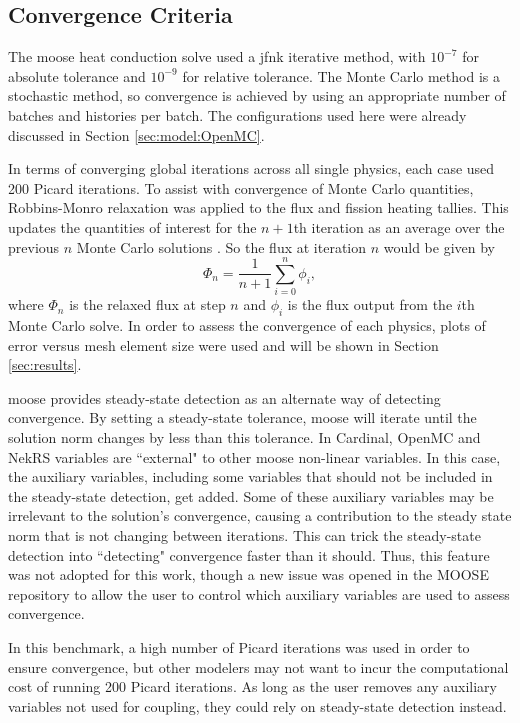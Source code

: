 \documentclass[letterpaper]{mc2023}
\begin{document}
\subsection{Convergence Criteria}
The \gls{moose} heat conduction solve used a \gls{jfnk} iterative method, with $10^{-7}$ for absolute tolerance and $10^{-9}$ for
relative tolerance. The Monte Carlo method is a stochastic method, so convergence is achieved by using an appropriate number of
batches and histories per batch. The configurations used here were already discussed in Section \ref{sec:model:OpenMC}.

In terms of converging global iterations across all single physics, each case used 200 Picard iterations. To assist with
convergence of Monte Carlo quantities, Robbins-Monro relaxation was applied to the flux and fission heating tallies. This updates the
quantities of interest for the $n+1$th iteration as an average over the previous $n$ Monte Carlo solutions \cite{dufek}.
So the flux at iteration $n$ would be given by
\begin{equation}\label{eq:Robbins-Monro}
    \Phi_{n} = \frac{1}{n+1} \sum_{i=0}^{n} \phi_{i},
\end{equation}
where $\Phi_{n}$ is the relaxed flux at step $n$ and $\phi_{i}$ is the flux output from the $i$th Monte Carlo solve. In order to
assess the convergence of each physics, plots of error versus mesh element size were used and will be shown in Section \ref{sec:results}.

\gls{moose} provides steady-state detection as an alternate way of detecting convergence. By setting a steady-state tolerance, \gls{moose}
will iterate until the solution norm changes by less than this tolerance. In Cardinal, OpenMC and NekRS variables are ``external" to other
\gls{moose} non-linear variables. In this case, the auxiliary variables, including some variables that should not be included in the
steady-state detection, get added. Some of these auxiliary variables may be irrelevant to the solution's convergence, causing a contribution
to the steady state norm that is not changing between iterations. This can trick the steady-state detection into ``detecting" convergence
faster than it should. Thus, this feature was not adopted for this work, though a new issue was opened in the MOOSE repository to allow the
user to control which auxiliary variables are used to assess convergence.

In this benchmark, a high number of Picard iterations was used in order to ensure convergence, but other modelers may not want to incur
the computational cost of running 200 Picard iterations. As long as the user removes any auxiliary variables not used for coupling, they
could rely on steady-state detection instead.
\end{document}
